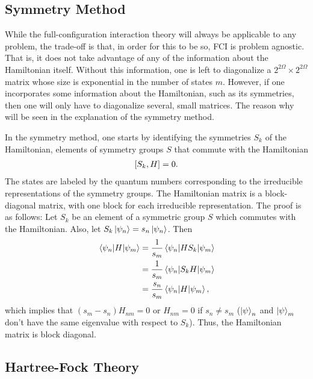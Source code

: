 \documentclass[10pt]{article}
\begin{document}
\subsection{Symmetry Method} 
\label{symmetry_method_subsection}

While the full-configuration interaction theory will always be applicable to any problem, the trade-off is that, in order for this to be so, FCI is problem agnostic. That is, it does not take advantage of any of the information about the Hamiltonian itself. Without this information, one is left to diagonalize a $2^{2\Omega}\times 2^{2\Omega}$ matrix whose size is exponential in the number of states $m$. However, if one incorporates some information about the Hamiltonian, such as its symmetries, then one will only have to diagonalize several, small matrices. The reason why will be seen in the explanation of the symmetry method.

In the symmetry method, one starts by identifying the symmetries $S_k$ of the Hamiltonian, elements of symmetry groups $S$ that commute with the Hamiltonian
\begin{align}
\comm{S_k}{H}=0.
\end{align}
The states are labeled by the quantum numbers corresponding to the irreducible representations of the symmetry groups. The Hamiltonian matrix is a block-diagonal matrix, with one block for each irreducible representation. The proof is as follows: Let $S_k$ be an element of a symmetric group $S$ which commutes with the Hamiltonian. Also, let $S_k\ket{\psi_n}=s_n\ket{\psi_n}$. Then
\begin{align}
\mel{\psi_n}{H}{\psi_m}
&=
\frac{1}{s_m}\mel{\psi_n}{HS_k}{\psi_m}
\\
&=
\frac{1}{s_m}\mel{\psi_n}{S_kH}{\psi_m}
\\
&=\frac{s_n}{s_m}\mel{\psi_n}{H}{\psi_m},
\end{align}
which implies that $(s_m-s_n)H_{nm}=0$ or $H_{nm}=0$ if $s_n\neq s_m$ ($\ket{\psi}_n$ and $\ket{\psi}_m$ don't have the same eigenvalue with respect to $S_k$). Thus, the Hamiltonian matrix is block diagonal.

\subsection{Hartree-Fock Theory}
\label{subsection:hartree_fock_theory}
\end{document}
